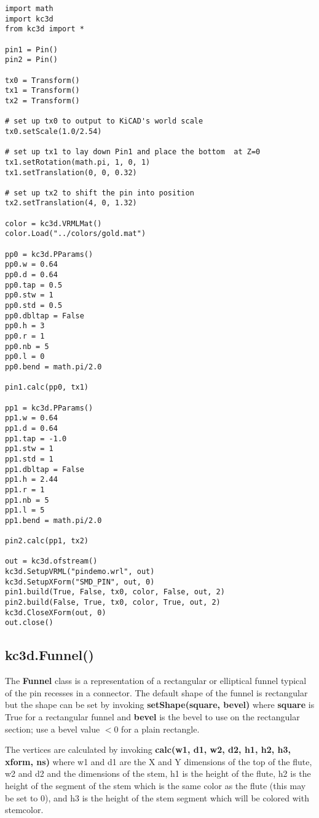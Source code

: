 \documentclass[a4paper, dvipdfm]{article}
\begin{document}
\begin{verbatim}
import math
import kc3d
from kc3d import *

pin1 = Pin()
pin2 = Pin()

tx0 = Transform()
tx1 = Transform()
tx2 = Transform()

# set up tx0 to output to KiCAD's world scale
tx0.setScale(1.0/2.54)

# set up tx1 to lay down Pin1 and place the bottom  at Z=0
tx1.setRotation(math.pi, 1, 0, 1)
tx1.setTranslation(0, 0, 0.32)

# set up tx2 to shift the pin into position
tx2.setTranslation(4, 0, 1.32)

color = kc3d.VRMLMat()
color.Load("../colors/gold.mat")

pp0 = kc3d.PParams()
pp0.w = 0.64
pp0.d = 0.64
pp0.tap = 0.5
pp0.stw = 1
pp0.std = 0.5
pp0.dbltap = False
pp0.h = 3
pp0.r = 1
pp0.nb = 5
pp0.l = 0
pp0.bend = math.pi/2.0

pin1.calc(pp0, tx1)

pp1 = kc3d.PParams()
pp1.w = 0.64
pp1.d = 0.64
pp1.tap = -1.0
pp1.stw = 1
pp1.std = 1
pp1.dbltap = False
pp1.h = 2.44
pp1.r = 1
pp1.nb = 5
pp1.l = 5
pp1.bend = math.pi/2.0

pin2.calc(pp1, tx2)

out = kc3d.ofstream()
kc3d.SetupVRML("pindemo.wrl", out)
kc3d.SetupXForm("SMD_PIN", out, 0)
pin1.build(True, False, tx0, color, False, out, 2)
pin2.build(False, True, tx0, color, True, out, 2)
kc3d.CloseXForm(out, 0)
out.close()
\end{verbatim}

\subsection{kc3d.Funnel()}
The \textbf{Funnel} class is a representation of a rectangular or elliptical funnel typical
of the pin recesses in a connector. The default shape of the funnel is rectangular but the
shape can be set by invoking \textbf{setShape(square, bevel)} where \textbf{square} is True for
a rectangular funnel and \textbf{bevel} is the bevel to use on the rectangular section; use
a bevel value $<0$ for a plain rectangle.

The vertices are calculated by invoking \textbf{calc(w1, d1, w2, d2, h1, h2, h3, xform, ns)}
where w1 and d1 are the X and Y dimensions of the top of the flute, w2 and d2 and the
dimensions of the stem, h1 is the height of the flute, h2 is the height of the segment of
the stem which is the same color as the flute (this may be set to 0), and h3 is the
height of the stem segment which will be colored with stemcolor.
\end{document}
